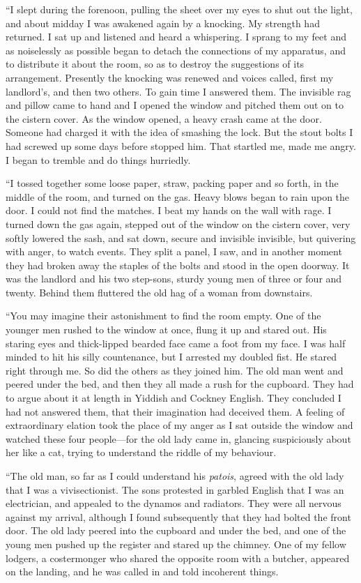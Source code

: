 “I slept during the forenoon, pulling the sheet over my eyes to shut out the light, and about midday I was awakened again by a knocking. My strength had returned. I sat up and listened and heard a whispering. I sprang to my feet and as noiselessly as possible began to detach the connections of my apparatus, and to distribute it about the room, so as to destroy the suggestions of its arrangement. Presently the knocking was renewed and voices called, first my landlord’s, and then two others. To gain time I answered them. The invisible rag and pillow came to hand and I opened the window and pitched them out on to the cistern cover. As the window opened, a heavy crash came at the door. Someone had charged it with the idea of smashing the lock. But the stout bolts I had screwed up some days before stopped him. That startled me, made me angry. I began to tremble and do things hurriedly.

“I tossed together some loose paper, straw, packing paper and so forth, in the middle of the room, and turned on the gas. Heavy blows began to rain upon the door. I could not find the matches. I beat my hands on the wall with rage. I turned down the gas again, stepped out of the window on the cistern cover, very softly lowered the sash, and sat down, secure and invisible invisible, but quivering with anger, to watch events. They split a panel, I saw, and in another moment they had broken away the staples of the bolts and stood in the open doorway. It was the landlord and his two step-sons, sturdy young men of three or four and twenty. Behind them fluttered the old hag of a woman from downstairs.

“You may imagine their astonishment to find the room empty. One of the younger men rushed to the window at once, flung it up and stared out. His staring eyes and thick-lipped bearded face came a foot from my face. I was half minded to hit his silly countenance, but I arrested my doubled fist. He stared right through me. So did the others as they joined him. The old man went and peered under the bed, and then they all made a rush for the cupboard. They had to argue about it at length in Yiddish and Cockney English. They concluded I had not answered them, that their imagination had deceived them. A feeling of extraordinary elation took the place of my anger as I sat outside the window and watched these four people—for the old lady came in, glancing suspiciously about her like a cat, trying to understand the riddle of my behaviour.

“The old man, so far as I could understand his \emph{patois}, agreed with the old lady that I was a vivisectionist. The sons protested in garbled English that I was an electrician, and appealed to the dynamos and radiators. They were all nervous against my arrival, although I found subsequently that they had bolted the front door. The old lady peered into the cupboard and under the bed, and one of the young men pushed up the register and stared up the chimney. One of my fellow lodgers, a costermonger who shared the opposite room with a butcher, appeared on the landing, and he was called in and told incoherent things.

